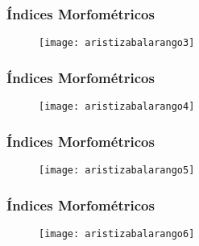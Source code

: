 \documentclass{beamer}
\begin{document}
\begin{frame}
\frametitle{Índices Morfométricos}
 \begin{figure}
    \centering
    \texttt{[image: aristizabalarango3]}
  \end{figure}
\end{frame}
\begin{frame}
\frametitle{Índices Morfométricos}
 \begin{figure}
    \centering
    \texttt{[image: aristizabalarango4]}
  \end{figure}
\end{frame}
\begin{frame}
\frametitle{Índices Morfométricos}
 \begin{figure}
    \centering
    \texttt{[image: aristizabalarango5]}
  \end{figure}
\end{frame}
\begin{frame}
\frametitle{Índices Morfométricos}
 \begin{figure}
    \centering
    \texttt{[image: aristizabalarango6]}
  \end{figure}
\end{frame}
\end{document}
